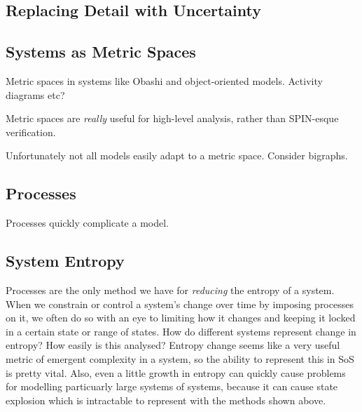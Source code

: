 \documentclass[draft,12pt]{article}
\begin{document}
\subsection{Replacing Detail with Uncertainty}


\subsection{Systems as Metric Spaces}
Metric spaces in systems like Obashi and object-oriented models. Activity diagrams etc?
\par

Metric spaces are \emph{really} useful for high-level analysis, rather than SPIN-esque verification.
\par

Unfortunately not all models easily adapt to a metric space. Consider bigraphs.
\par

\subsection{Processes}
Processes quickly complicate a model.


\subsection{System Entropy}
Processes are the only method we have for \emph{reducing} the entropy of a system.
When we constrain or control a system's change over time by imposing processes on it, we often do so with an eye to limiting how it changes and keeping it locked in a certain state or range of states.
How do different systems represent change in entropy? How easily is this analysed?
Entropy change seems like a very useful metric of emergent complexity in a system, so the ability to represent this in SoS is pretty vital.
Also, even a little growth in entropy can quickly cause problems for modelling particuarly large systems of systems, because it can cause state explosion which is intractable to represent with the methods shown above.  
\par
\end{document}
